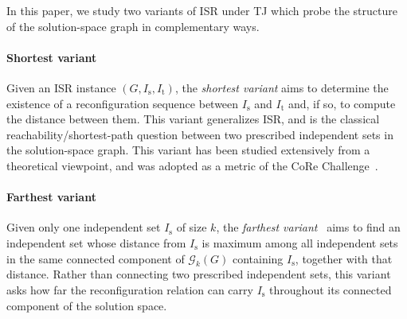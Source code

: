 \documentclass[conference]{IEEEtran}
\newcommand{\ini}{\mathrm{s}}
\newcommand{\tar}{\mathrm{t}}
\newcommand{\solgraph}[2]{\mathcal{G}_{#1}(#2)}
\newcommand{\ISR}{\textsc{ISR}\xspace}
\newcommand{\TJrule}{\textsc{TJ}\xspace}
\begin{document}
In this paper, we study two variants of \ISR under \TJrule which probe the structure of the solution-space graph in complementary ways.

\paragraph{Shortest variant} 
Given an \ISR instance $(G, I_\ini, I_\tar)$, the \emph{shortest variant} aims to
determine the existence of a reconfiguration sequence between $I_\ini$ and
$I_\tar$ and, if so, to compute the distance between them. 
This variant generalizes \ISR, and is the classical
reachability/shortest-path question between two prescribed independent sets in the solution-space graph.
This variant has been studied extensively from a theoretical viewpoint, and was adopted as a metric of the CoRe Challenge~\cite{sotaokit24}.

\paragraph{Farthest variant}
Given only one independent set $I_\ini$ of size $k$, the \emph{farthest variant}~\cite{ItoKNSSTT23} aims to find an
independent set whose distance from $I_\ini$ is maximum among all
independent sets in the same connected component of $\solgraph{k}{G}$ containing $I_\ini$, together with that distance. Rather than connecting
two prescribed independent sets, this variant asks how far the reconfiguration
relation can carry $I_\ini$ throughout its connected component of the solution
space. 
\end{document}
